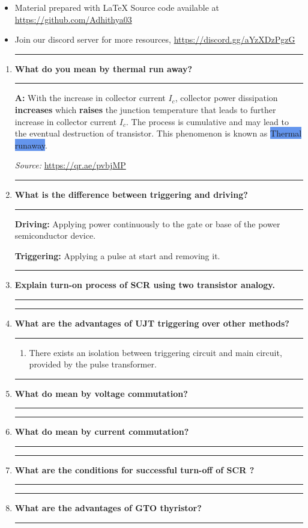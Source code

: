 \documentclass[12pt]{article}
\newcommand\question[1]{\item\vspace{.25in}\hrule\textbf{#1}\vspace{.5em}\hrule\vspace{.10in}}
\newcommand\answer{\vspace{.10in}\textbf{A: }}
\newcommand\justurl[1]{\textcolor{okbokk}{{\url{#1}}}}
\newcommand\B{\textbf}
\newcommand\p{\item}
\newcommand\see[1]{\vspace{0.1in}\textit{Source: }\textcolor{okbokk}{{\url{#1}}}}
\newcommand\hlb[1]{\colorbox{CornflowerBlue}{#1}}
\begin{document}
\raggedright

\begin{itemize} 
    \p[$\square$] Material prepared with \LaTeX{} Source code available at \justurl{https://github.com/Adhithya03}\\

    \p[$\square$] Join our discord server for more resources, \justurl{https://discord.gg/aYzXDzPgzG}
\end{itemize}



\begin{enumerate}
    \question{What do you mean by thermal run away?}

    \answer With the increase in collector current $I_c$, collector power dissipation \B{increases} which \B{raises} the junction temperature that leads to further increase in collector current $I_c$. The process is cumulative and may lead to the eventual destruction of transistor. This phenomenon is known as \hlb{Thermal runaway}.

    \see{https://qr.ae/pvbjMP}
    
    \question{What is the difference between triggering and driving?}
    
    \B{Driving:} Applying power continuously to the gate or base of the power semiconductor device.
    \vspace{0.1in}

    \B{Triggering:} Applying a pulse at start and removing it.

    \question{Explain turn-on process of SCR using two transistor analogy.}
    
    \question{What are the advantages of UJT triggering over other methods?}
    
    \begin{enumerate}
        
        \p There exists an isolation between triggering circuit and main circuit, provided by the pulse transformer.


    \end{enumerate}


    \question{What do mean by voltage commutation?}
    
    \question{What do mean by current commutation?}
    
    \question{What are the conditions for successful turn-off of SCR ?}
    
    \question{What are the advantages of GTO thyristor?}
    

\end{enumerate}
\end{document}
